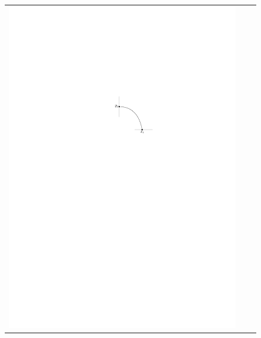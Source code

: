 \documentclass{jgaa-art}
\begin{document}
\begin{figure}
   \begin{center}
     \begin{tabular}{ccc}
       \includegraphics{figs/silly-1} &

\end{tabular}
\end{center}
\end{figure}
\end{document}
